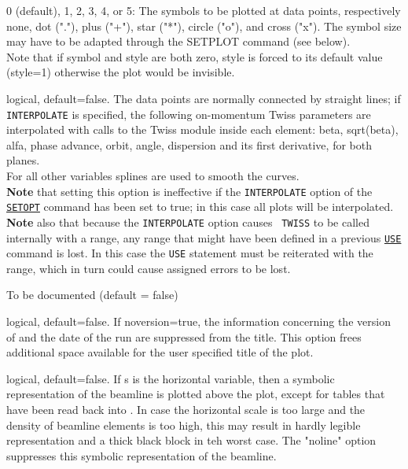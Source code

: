 \begin{madlist}
    0 (default), 1, 2, 3, 4, or 5: The symbols to be
     plotted at data points, respectively none, dot ("."), plus ("+"),
     star ("*"), circle ("o"), and cross ("x").  
     The symbol size may have to be adapted through the SETPLOT command
     (see below). \\ 
     Note that if symbol and style are both zero, style is
     forced to its default value (style=1) otherwise the plot would be
     invisible. 

    logical, default=false. The data points are
     normally connected by straight lines; if {\tt INTERPOLATE} is
     specified, the following on-momentum Twiss parameters are
     interpolated with calls to the Twiss module inside 
     each element: beta, sqrt(beta), alfa, phase advance, orbit, angle,
     dispersion and its first derivative, for both planes. \\ 
     For all other variables splines are used to smooth
     the curves. \\ 
     {\bf Note} that setting this option is ineffective if the {\tt INTERPOLATE}
     option of the \hyperref[sec:setopt]{\tt SETOPT} command has been set to 
     true; in this case all plots will be interpolated. \\
     {\bf Note} also that because the {\tt INTERPOLATE} option causes {\tt 
     TWISS} to be called internally with a range, any range that might have 
     been defined in a previous \hyperref[sec:use]{\tt USE} command is lost. In 
     this case the {\tt USE} statement must be reiterated with the range, which 
     in turn could cause assigned errors to be lost.


    To be documented (default = false)

    logical, default=false. If noversion=true, the
     information concerning the version of \madx and the date of the run
     are suppressed from the title.  
     This option frees additional space available for the user specified
     title of the plot.  

    logical, default=false. If s is the horizontal
     variable, then a symbolic representation of the beamline is plotted
     above the plot, except for tables that have been read back into \madx. 
     In case the horizontal scale is too large and the density of
     beamline elements is too high, this may result in hardly legible
     representation and a thick black block in teh worst case. 
     The "noline" option suppresses this symbolic representation of the
     beamline. 


\end{madlist}
